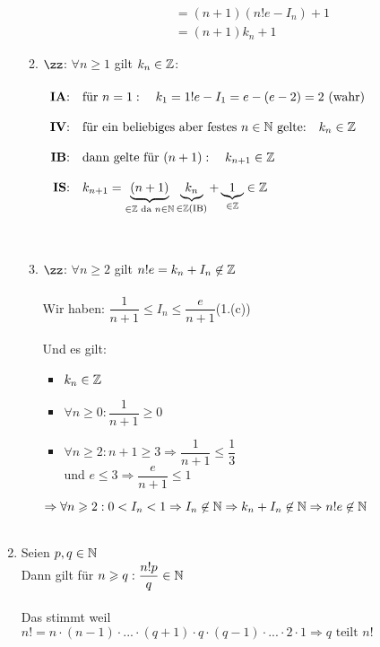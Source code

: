 \documentclass[main.tex]{subfiles}
\begin{document}
\begin{Beweis}
\begin{enumerate}
\begin{enumerate}
\begin{align*}
&=(n+1)(n!e-I_n)+1\\
&=(n+1)k_n+1
\end{align*}
\item $\zz$: $\forall n\geq1$ gilt $k_n\in\mathbb{Z}$:\\\\
$\begin{array}{rl}
\mbox{\textbf{IA}:} & \mbox{für }n=1:\quad k_1=1!e-I_1=e-(e-2)=2 \mbox{ (wahr)} \\\\
\mbox{\textbf{IV}:} & \mbox{für ein beliebiges aber festes }n\in\mathbb{N} \mbox{ gelte:}\quad k_n\in\mathbb{Z}\\\\
\mbox{\textbf{IB}:} & \mbox{dann gelte für }(n+1):\quad k_{n+1}\in\mathbb{Z}\\\\
\mbox{\textbf{IS}:} & k_{n+1}=\underbrace{(n+1)}_{\in\mathbb{Z}\text{ da }n\in\mathbb{N}}\underbrace{k_n}_{\in\mathbb{Z}\text{(IB)}}+\underbrace{1}_{\in\mathbb{Z}}\in\mathbb{Z}\\\\
\end{array}$
\\\\
\item $\zz$: $\forall n\geq 2$ gilt $n!e=k_n+I_n\not\in\mathbb{Z}$\\\\
Wir haben: $\dfrac{1}{n+1}\leq I_n \leq  \dfrac{e}{n+1}$\quad(1.(c))\\\\
Und es gilt: \begin{itemize}\item$k_n\in\mathbb{Z}$
				\item $\forall n\geq0:\dfrac{1}{n+1}\geq 0$
				\item $\forall n\geq2:n+1\geq3\Rightarrow \dfrac{1}{n+1}\leq \dfrac{1}{3}$\\
					und $e\leq3 \Rightarrow \dfrac{e}{n+1}\leq 1$\\
		\end{itemize}
$\Rightarrow\forall n\geqslant2:0<I_n<1\Rightarrow I_n\not\in\mathbb{N}\Rightarrow k_n+I_n\not\in\mathbb{N}\Rightarrow n!e\not\in\mathbb{N}$\\\\\end{enumerate}
\item Seien $p, q \in\mathbb{N}$\\
Dann gilt für $n\geqslant q:\dfrac{n!p}{q}\in\mathbb{N}$\\\\
Das stimmt weil $n!=n\cdot(n-1)\cdot...\cdot(q+1)\cdot q\cdot(q-1)\cdot...\cdot2\cdot1\Rightarrow q \text{ teilt }n!$

\end{enumerate}
\end{Beweis}
\end{document}
